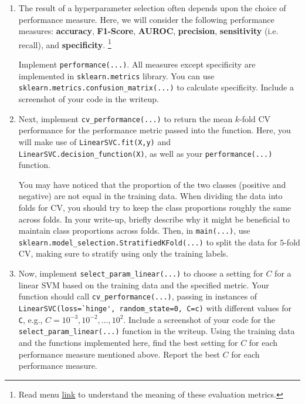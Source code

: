 \documentclass[11pt]{article}
\begin{document}
\begin{enumerate}

\item {} The result of a hyperparameter selection often depends upon the choice of performance measure. Here, we will consider the following performance measures: \textbf{accuracy}, \textbf{F1-Score}, \textbf{AUROC}, \textbf{precision}, \textbf{sensitivity} (i.e. recall), and \textbf{specificity}.
\footnote{Read menu \href{http://scikit-learn.org/stable/modules/model_evaluation.html#roc-metrics}{link} to understand the meaning of these evaluation metrics.}

Implement \verb|performance(...)|. All measures except specificity are implemented in \verb|sklearn.metrics| library. You can use \verb|sklearn.metrics.confusion_matrix(...)| to calculate specificity. Include a screenshot of your code in the writeup.
\vspace{3cm}

\item {} Next, implement \verb|cv_performance(...)| to return the mean $k$-fold CV performance for the performance metric passed into the function. Here, you will make use of \verb|LinearSVC.fit(X,y)| and \verb|LinearSVC.decision_function(X)|, as well as your \verb|performance(...)| function.

You may have noticed that the proportion of the two classes (positive and negative) are not equal in the training data. When dividing the data into folds for CV, you should try to keep the class proportions roughly the same across folds. In your write-up, briefly describe why it might be beneficial to maintain class proportions across folds. Then, in \verb|main(...)|, use \verb|sklearn.model_selection.StratifiedKFold(...)| to split the data for $5$-fold CV, making sure to stratify using only the training labels.
\vspace{3cm}

\item {} Now, implement \verb|select_param_linear(...)| to choose a setting for $C$ for a linear SVM based on the training data and the specified metric. Your function should call \verb|cv_performance(...)|, passing in instances of \verb|LinearSVC(loss=`hinge', random_state=0, C=c)| with different values for \verb|C|, e.g., $C = 10^{-3}, 10^{-2}, \ldots, 10^{2}$. Include a screenshot of your code for the \verb|select_param_linear(...)| function in the writeup. Using the training data and the functions implemented here, find the best setting for $C$ for each performance measure mentioned above. Report the best $C$ for each performance measure.
\vspace{9cm}

\end{enumerate}
\end{document}
